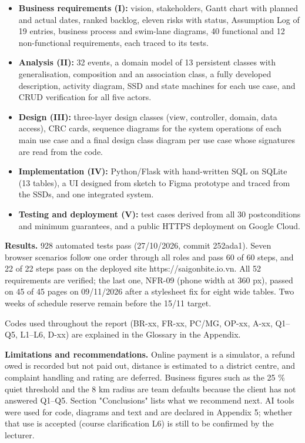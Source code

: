 \begin{itemize}
\item \textbf{Business requirements (I):} vision, stakeholders, Gantt chart with planned and actual dates, ranked backlog, eleven risks with status, Assumption Log of 19 entries, business process and swim-lane diagrams, 40 functional and 12 non-functional requirements, each traced to its tests.

\item \textbf{Analysis (II):} 32 events, a domain model of 13 persistent classes with generalisation, composition and an association class, a fully developed description, activity diagram, SSD and state machines for each use case, and CRUD verification for all five actors.

\item \textbf{Design (III):} three-layer design classes (view, controller, domain, data access), CRC cards, sequence diagrams for the system operations of each main use case and a final design class diagram per use case whose signatures are read from the code.

\item \textbf{Implementation (IV):} Python/Flask with hand-written SQL on SQLite (13 tables), a UI designed from sketch to Figma prototype and traced from the SSDs, and one integrated system.

\item \textbf{Testing and deployment (V):} test cases derived from all 30 postconditions and minimum guarantees, and a public HTTPS deployment on Google Cloud.

\end{itemize}
\textbf{Results.} 928 automated tests pass (27/10/2026, commit 252ada1). Seven browser scenarios follow one order through all roles and pass 60 of 60 steps, and 22 of 22 steps pass on the deployed site https://saigonbite.io.vn. All 52 requirements are verified; the last one, NFR-09 (phone width at 360 px), passed on 45 of 45 pages on 09/11/2026 after a stylesheet fix for eight wide tables. Two weeks of schedule reserve remain before the 15/11 target.

Codes used throughout the report (BR-xx, FR-xx, PC/MG, OP-xx, A-xx, Q1--Q5, L1--L6, D-xx) are explained in the Glossary in the Appendix.

\textbf{Limitations and recommendations.} Online payment is a simulator, a refund owed is recorded but not paid out, distance is estimated to a district centre, and complaint handling and rating are deferred. Business figures such as the 25 \% quiet threshold and the 8 km radius are team defaults because the client has not answered Q1--Q5. Section "Conclusions" lists what we recommend next. AI tools were used for code, diagrams and text and are declared in Appendix 5; whether that use is accepted (course clarification L6) is still to be confirmed by the lecturer.
